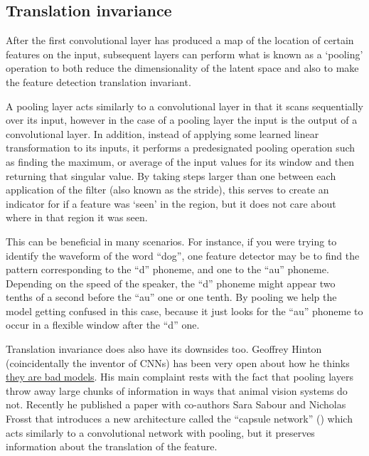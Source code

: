 \documentclass[]{book}
\theoremstyle{definition}
\theoremstyle{definition}
\theoremstyle{definition}
\theoremstyle{remark}
\begin{document}
\subsection{Translation invariance}\label{translation-invariance}

After the first convolutional layer has produced a map of the location
of certain features on the input, subsequent layers can perform what is
known as a `pooling' operation to both reduce the dimensionality of the
latent space and also to make the feature detection translation
invariant.

A pooling layer acts similarly to a convolutional layer in that it scans
sequentially over its input, however in the case of a pooling layer the
input is the output of a convolutional layer. In addition, instead of
applying some learned linear transformation to its inputs, it performs a
predesignated pooling operation such as finding the maximum, or average
of the input values for its window and then returning that singular
value. By taking steps larger than one between each application of the
filter (also known as the stride), this serves to create an indicator
for if a feature was `seen' in the region, but it does not care about
where in that region it was seen.

This can be beneficial in many scenarios. For instance, if you were
trying to identify the waveform of the word ``dog'', one feature
detector may be to find the pattern corresponding to the ``d'' phoneme,
and one to the ``au'' phoneme. Depending on the speed of the speaker,
the ``d'' phoneme might appear two tenths of a second before the ``au''
one or one tenth. By pooling we help the model getting confused in this
case, because it just looks for the ``au'' phoneme to occur in a
flexible window after the ``d'' one.

Translation invariance does also have its downsides too. Geoffrey Hinton
(coincidentally the inventor of CNNs) has been very open about how he
thinks
\href{www.youtube.com\%2Fwatch\%3Fv\%3DrTawFwUvnLE\&usg=AOvVaw3CKtrHEhfBZkXdd7xgJ1PM}{they
are bad models}. His main complaint rests with the fact that pooling
layers throw away large chunks of information in ways that animal vision
systems do not. Recently he published a paper with co-authors Sara
Sabour and Nicholas Frosst that introduces a new architecture called the
``capsule network'' (\citet{capsnet}) which acts similarly to a
convolutional network with pooling, but it preserves information about
the translation of the feature.
\end{document}
